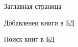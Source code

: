 \begin{figure}[h]
	\caption{Заглавная страница}
	\label{ris:image}
\end{figure}
\hfill
\begin{figure}[h]
	\caption{Добавленеи книги в БД}
	\label{ris:image}
\end{figure}
\hfill
\begin{figure}[h]
	\caption{Поиск книг в БД}
	\label{ris:image}
\end{figure}
